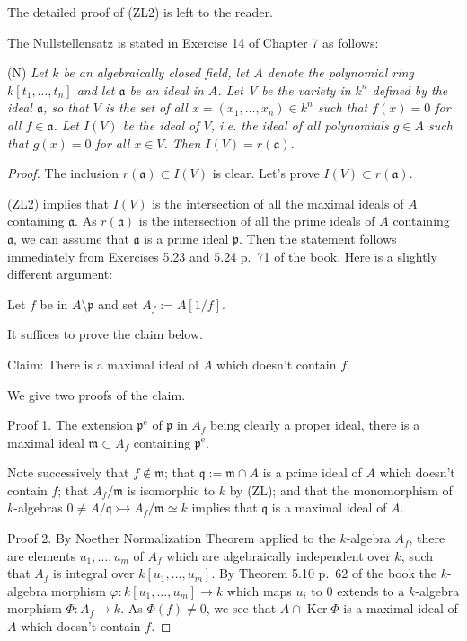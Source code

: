 \documentclass[parskip=half]{scrartcl}%
\newcommand{\oo}{\operatorname}
\newcommand{\mf}{\mathfrak}
\newcommand{\mono}{\rightarrowtail}
\begin{document}
The detailed proof of (ZL2) is left to the reader.

The Nullstellensatz is stated in Exercise 14 of Chapter 7 as follows:

(N) \emph{Let $k$ be an algebraically closed field, let $A$ denote the polynomial ring $k[t_1,\dots,t_n]$ and let $\mf a$ be an ideal in $A$. Let V be the variety in $k^n$ defined by the ideal $\mf a$, so that $V$ is the set of all $x=(x_1,\dots,x_n)\in k^n$ such that $f(x)=0$ for all $f\in\mf a$. Let $I(V)$ be the ideal of $V$, i.e. the ideal of all polynomials $g\in A$ such that $g(x)=0$ for all $x\in V$. Then $I(V)=r(\mf a)$.}

\begin{proof} 
The inclusion $r(\mf a)\subset I(V)$ is clear. Let's prove $I(V)\subset r(\mf a)$. 

(ZL2) implies that $I(V)$ is the intersection of all the maximal ideals of $A$ containing $\mf a$. As $r(\mf a)$ is the intersection of all the prime ideals of $A$ containing $\mf a$, we can assume that $\mf a$ is a prime ideal $\mf p$. Then the statement follows immediately from Exercises 5.23 and 5.24 p.~71 of the book. Here is a slightly different argument:

Let $f$ be in $A\setminus\mf p$ and set $A_f:=A[1/f]$.

It suffices to prove the claim below.

Claim: There is a maximal ideal of $A$ which doesn't contain $f$. 

We give two proofs of the claim.

Proof 1. The extension $\mf p^{\oo e}$ of $\mf p$ in $A_f$ being clearly a proper ideal, there is a maximal ideal $\mf m\subset A_f$ containing $\mf p^{\oo e}$. 

Note successively that $f\notin\mf m$; that $\mf q:=\mf m\cap A$ is a prime ideal of $A$ which doesn't contain $f$; that $A_f/\mf m$ is isomorphic to $k$ by (ZL); and that the monomorphism of $k$-algebras $0\ne A/\mf q\mono A_f/\mf m\simeq k$ implies that $\mf q$ is a maximal ideal of $A$.

Proof 2. By Noether Normalization Theorem applied to the $k$-algebra $A_f$, there are elements $u_1,\dots,u_m$ of $A_f$ which are algebraically independent over $k$, such that $A_f$ is integral over $k[u_1,\dots,u_m]$. By Theorem 5.10 p.~62 of the book the $k$-algebra morphism $\varphi:k[u_1,\dots,u_m]\to k$ which maps $u_i$ to $0$ extends to a $k$-algebra morphism $\Phi:A_f\to k$. As $\Phi(f)\ne0$, we see that $A\cap\oo{Ker}\Phi$ is a maximal ideal of $A$ which doesn't contain $f$.
\end{proof}
\end{document}
